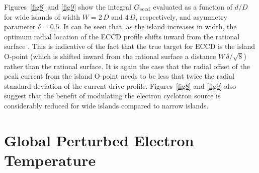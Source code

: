 \documentclass{iopjournal}
\begin{document}
Figures~\ref{fig8} and \ref{fig9} show the integral $G_{\rm eccd}$ evaluated  as a function of $d/D$ for wide islands of width $W=2\,D$ and $4\,D$, respectively, and asymmetry parameter
$\delta=0.5$. It can be seen that, as the island increases in width, the optimum radial location of the ECCD profile shifts inward from the rational
surface \cite{ece6}. This is indicative of the fact that the true target for ECCD is the island O-point (which is shifted inward from the
rational surface a distance $W\,\delta/\sqrt{8}$) rather than the rational surface. It is again the case that the radial offset of the peak current from the island
O-point needs to be less that twice the radial standard deviation of the current drive profile. 
Figures~\ref{fig8} and \ref{fig9}  also suggest that the benefit of modulating the
electron cyclotron source is considerably reduced for wide islands compared to narrow islands. 

\section{Global Perturbed Electron Temperature}\label{s5}
\end{document}
